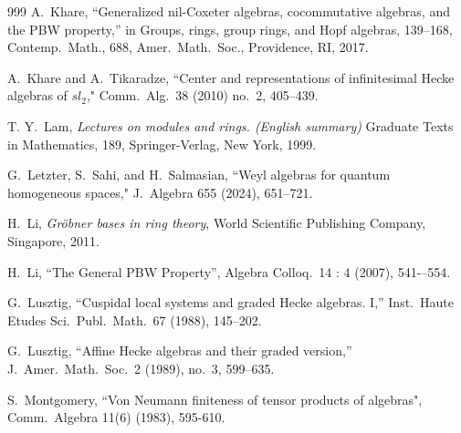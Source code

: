\documentclass[11pt]{amsart}
\numberwithin{equation}{section}
\renewcommand{\_}[1]{\mbox{$_{\left( #1 \right)}$}}
\begin{document}
{\begin{thebibliography}{999}
 A.\ Khare, ``Generalized nil-Coxeter algebras,
cocommutative algebras, and the PBW property,'' 
in Groups, rings, group rings, and Hopf algebras,
139--168, Contemp.\ Math., 688, Amer.\ Math.\ Soc., Providence, RI, 2017. 

A.~Khare and A.~Tikaradze, ``Center and representations of infinitesimal
Hecke algebras of $sl_2$," Comm.~Alg.~38 (2010) no.~2, 405--439.

T. Y.\ Lam,
{\em Lectures on modules and rings. (English summary)}
Graduate Texts in Mathematics, 189, Springer-Verlag, New York, 1999.

G.~Letzter, S.~Sahi, and H.~Salmasian,
``Weyl algebras for quantum homogeneous spaces,"
J.~Algebra 655 (2024), 651--721.


  H.\ Li,
 {\em Gr\"obner bases in ring theory},
  World Scientific Publishing Company, Singapore, 2011.

  H.\ Li,
  ``The General PBW Property'', 
  Algebra Colloq.\ 14 : 4 (2007), 541-–554.
  

 G.\ Lusztig, ``Cuspidal local systems and graded
{H}ecke algebras. {I},'' Inst.\ Haute Etudes Sci.\ Publ.\ Math.\
67 (1988), 145--202. 

 G.\ Lusztig, ``Affine Hecke algebras and their graded
version,'' J.\ Amer.\ Math.\ Soc.\ 2 (1989), no.\ 3, 599--635. 





  S.\ Montgomery,
  ``Von Neumann finiteness of tensor products of algebras",
Comm.\ Algebra 11(6) (1983), 595-610.





\end{thebibliography}}
\end{document}
